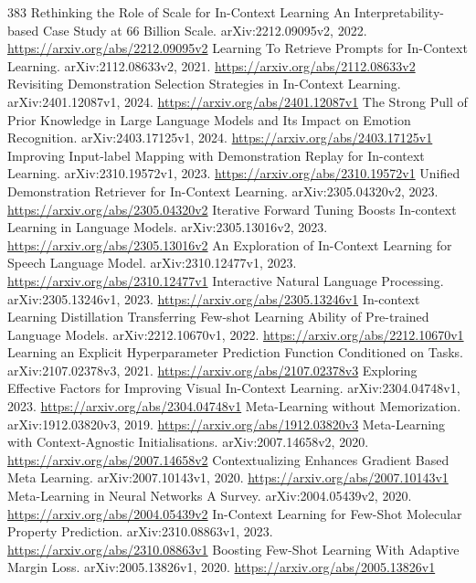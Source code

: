 \documentclass[11pt]{article}
\begin{document}
\begin{thebibliography}{383}
 Rethinking the Role of Scale for In-Context Learning An Interpretability-based Case Study at 66 Billion Scale. arXiv:2212.09095v2, 2022. \url{https://arxiv.org/abs/2212.09095v2}
 Learning To Retrieve Prompts for In-Context Learning. arXiv:2112.08633v2, 2021. \url{https://arxiv.org/abs/2112.08633v2}
 Revisiting Demonstration Selection Strategies in In-Context Learning. arXiv:2401.12087v1, 2024. \url{https://arxiv.org/abs/2401.12087v1}
 The Strong Pull of Prior Knowledge in Large Language Models and Its Impact on Emotion Recognition. arXiv:2403.17125v1, 2024. \url{https://arxiv.org/abs/2403.17125v1}
 Improving Input-label Mapping with Demonstration Replay for In-context Learning. arXiv:2310.19572v1, 2023. \url{https://arxiv.org/abs/2310.19572v1}
 Unified Demonstration Retriever for In-Context Learning. arXiv:2305.04320v2, 2023. \url{https://arxiv.org/abs/2305.04320v2}
 Iterative Forward Tuning Boosts In-context Learning in Language Models. arXiv:2305.13016v2, 2023. \url{https://arxiv.org/abs/2305.13016v2}
 An Exploration of In-Context Learning for Speech Language Model. arXiv:2310.12477v1, 2023. \url{https://arxiv.org/abs/2310.12477v1}
 Interactive Natural Language Processing. arXiv:2305.13246v1, 2023. \url{https://arxiv.org/abs/2305.13246v1}
 In-context Learning Distillation Transferring Few-shot Learning Ability of Pre-trained Language Models. arXiv:2212.10670v1, 2022. \url{https://arxiv.org/abs/2212.10670v1}
 Learning an Explicit Hyperparameter Prediction Function Conditioned on Tasks. arXiv:2107.02378v3, 2021. \url{https://arxiv.org/abs/2107.02378v3}
 Exploring Effective Factors for Improving Visual In-Context Learning. arXiv:2304.04748v1, 2023. \url{https://arxiv.org/abs/2304.04748v1}
 Meta-Learning without Memorization. arXiv:1912.03820v3, 2019. \url{https://arxiv.org/abs/1912.03820v3}
 Meta-Learning with Context-Agnostic Initialisations. arXiv:2007.14658v2, 2020. \url{https://arxiv.org/abs/2007.14658v2}
 Contextualizing Enhances Gradient Based Meta Learning. arXiv:2007.10143v1, 2020. \url{https://arxiv.org/abs/2007.10143v1}
 Meta-Learning in Neural Networks A Survey. arXiv:2004.05439v2, 2020. \url{https://arxiv.org/abs/2004.05439v2}
 In-Context Learning for Few-Shot Molecular Property Prediction. arXiv:2310.08863v1, 2023. \url{https://arxiv.org/abs/2310.08863v1}
 Boosting Few-Shot Learning With Adaptive Margin Loss. arXiv:2005.13826v1, 2020. \url{https://arxiv.org/abs/2005.13826v1}

\end{thebibliography}
\end{document}
